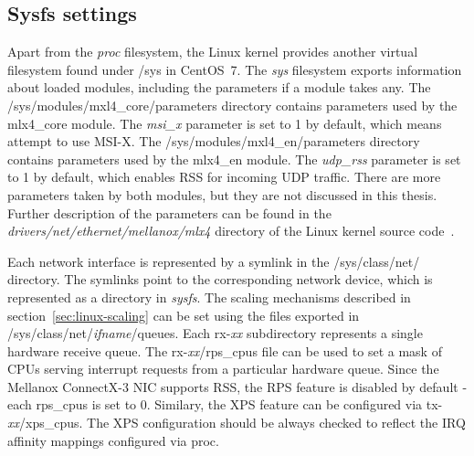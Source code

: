 
\subsection{Sysfs settings}\label{sub:analysis-settings-sysfs}
Apart from the {\it{proc}} filesystem, the Linux kernel provides another virtual filesystem found under /sys in CentOS~7.
The {\it{sys}} filesystem exports information about loaded modules, including the parameters if a module takes any.
The /sys/modules/mxl4\_core/parameters directory contains parameters used by the mlx4\_core module.
The {\it{msi\_x}} parameter is set to 1 by default, which means attempt to use MSI-X.
The /sys/modules/mxl4\_en/parameters directory contains parameters used by the mlx4\_en module.
The {\it{udp\_rss}} parameter is set to 1 by default, which enables RSS for incoming UDP traffic.
There are more parameters taken by both modules, but they are not discussed in this thesis.
Further description of the parameters can be found
in the {\it{drivers/net/ethernet/mellanox/mlx4}} directory of the Linux kernel source code~\cite{kernel-source}.

Each network interface is represented by a symlink in the /sys/class/net/ directory.
The symlinks point to the corresponding network device, which is represented as a directory in {\it{sysfs}}.
The scaling mechanisms described in section~\ref{sec:linux-scaling} can be set
using the files exported in /sys/class/net/{\it{ifname}}/queues.
Each rx-{\it{xx}} subdirectory represents a single hardware receive queue.
The rx-{\it{xx}}/rps\_cpus file can be used to set a mask of CPUs serving interrupt requests from a particular hardware queue.
Since the Mellanox ConnectX-3 NIC supports RSS, the RPS feature is disabled by default - each rps\_cpus is set to 0.
Similary, the XPS feature can be configured via tx-{\it{xx}}/xps\_cpus.
The XPS configuration should be always checked to reflect the IRQ affinity mappings configured via proc.

